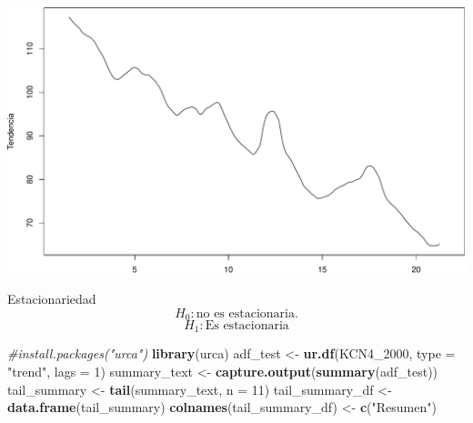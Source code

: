 \documentclass[
  10pt,
  ignorenonframetext,
  aspectratio=1612]{beamer}
\newenvironment{Shaded}{\begin{snugshade}}{\end{snugshade}}
\newcommand{\AttributeTok}[1]{\textcolor[rgb]{0.13,0.29,0.53}{#1}}
\newcommand{\CommentTok}[1]{\textcolor[rgb]{0.56,0.35,0.01}{\textit{#1}}}
\newcommand{\DecValTok}[1]{\textcolor[rgb]{0.00,0.00,0.81}{#1}}
\newcommand{\FunctionTok}[1]{\textcolor[rgb]{0.13,0.29,0.53}{\textbf{#1}}}
\newcommand{\NormalTok}[1]{#1}
\newcommand{\OtherTok}[1]{\textcolor[rgb]{0.56,0.35,0.01}{#1}}
\newcommand{\SpecialCharTok}[1]{\textcolor[rgb]{0.81,0.36,0.00}{\textbf{#1}}}
\newcommand{\StringTok}[1]{\textcolor[rgb]{0.31,0.60,0.02}{#1}}
\begin{document}
\begin{frame}[fragile]{}
\label{section-5}
\begin{Shaded}
\end{Shaded}

\includegraphics{Informe_files/figure-beamer/unnamed-chunk-12-1.pdf}
\end{frame}

\begin{frame}[fragile]{Estacionariedad}
\label{estacionariedad}
\[H_0: \text{no es estacionaria.}\] \[H_1: \text{Es estacionaria}\]

\begin{Shaded}
\begin{Highlighting}[]
\CommentTok{\#install.packages("urca")}
\FunctionTok{library}\NormalTok{(urca)}
\NormalTok{adf\_test }\OtherTok{\textless{}{-}} \FunctionTok{ur.df}\NormalTok{(KCN4\_2000, }\AttributeTok{type =} \StringTok{"trend"}\NormalTok{, }\AttributeTok{lags =} \DecValTok{1}\NormalTok{)}
\NormalTok{summary\_text }\OtherTok{\textless{}{-}} \FunctionTok{capture.output}\NormalTok{(}\FunctionTok{summary}\NormalTok{(adf\_test))}
\NormalTok{tail\_summary }\OtherTok{\textless{}{-}} \FunctionTok{tail}\NormalTok{(summary\_text, }\AttributeTok{n =} \DecValTok{11}\NormalTok{)}
\NormalTok{tail\_summary\_df }\OtherTok{\textless{}{-}} \FunctionTok{data.frame}\NormalTok{(tail\_summary)}
\FunctionTok{colnames}\NormalTok{(tail\_summary\_df) }\OtherTok{\textless{}{-}} \FunctionTok{c}\NormalTok{(}\StringTok{"Resumen"}\NormalTok{)}
\end{Highlighting}
\end{Shaded}
\end{frame}
\end{document}
